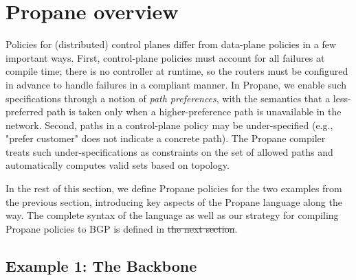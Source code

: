 \documentclass[10pt]{sigalternate052015} %
\newcommand{\sysname}{{\small \sf Propane}\xspace}
\providecommand{\DIFadd}[1]{{\protect\color{blue}\uwave{#1}}} %
\providecommand{\DIFdel}[1]{{\protect\color{red}\sout{#1}}}                      %
\providecommand{\DIFaddbegin}{} %
\providecommand{\DIFaddend}{} %
\providecommand{\DIFdelbegin}{} %
\providecommand{\DIFdelend}{} %
\begin{document}
%
%
%
%

\section{Propane overview}
\label{sec:propane}

Policies for (distributed) control planes differ from data-plane
policies in a few important ways. First, control-plane
policies must account for all failures at compile time; there is
no controller at runtime, so the routers must be configured in advance to handle failures in a compliant manner.
%
In \sysname, we enable such specifications through a notion of {\em path preferences}, with the semantics that a less-preferred path is taken only when a higher-preference path is unavailable in the network.
%
Second, paths in a control-plane policy may be under-specified (e.g.,
"prefer customer" does not indicate a concrete path). The \sysname
compiler treats such under-specifications as constraints on the set of
allowed paths and automatically computes valid sets based on \DIFaddbegin \DIFadd{the }\DIFaddend topology.
%

In the rest of this section, we define \sysname policies for the two 
examples from the previous section, introducing key aspects of
the \sysname language along the way. The complete syntax of the
language as well as our strategy for compiling \sysname policies to
BGP is defined in \DIFdelbegin \DIFdel{the next section}\DIFdelend \DIFaddbegin \DIFadd{\S\ref{sec:compilation}}\DIFaddend .

\subsection{Example 1: The Backbone}

\end{document}
